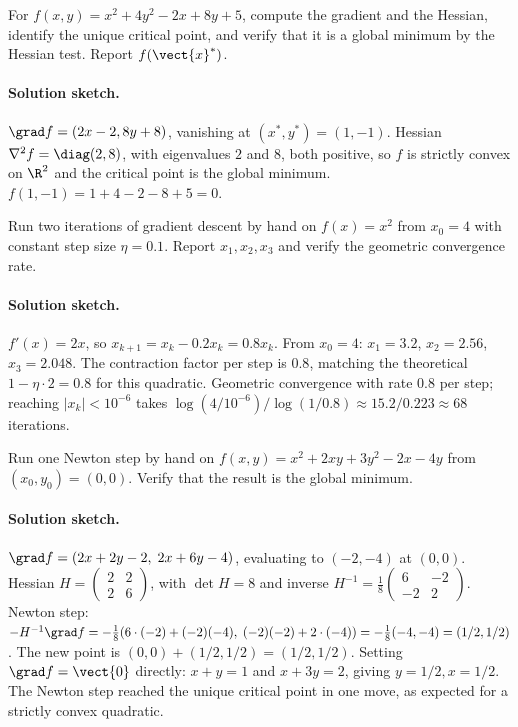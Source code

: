 \begin{exercise}
For $f(x, y) = x^{2} + 4 y^{2} - 2 x + 8 y + 5$, compute the
gradient and the Hessian, identify the unique critical point, and
verify that it is a global minimum by the Hessian test. Report
$f(\vect{x}^{*})$.
\end{exercise}

\paragraph{Solution sketch.}
$\grad f = (2 x - 2, 8 y + 8)$, vanishing at $(x^{*}, y^{*}) =
(1, -1)$. Hessian $\nabla^{2} f = \diag(2, 8)$, with eigenvalues
$2$ and $8$, both positive, so $f$ is strictly convex on $\R^{2}$
and the critical point is the global minimum. $f(1, -1) = 1 + 4 -
2 - 8 + 5 = 0$.

\begin{exercise}
Run two iterations of gradient descent by hand on $f(x) = x^{2}$
from $x_{0} = 4$ with constant step size $\eta = 0.1$. Report
$x_{1}, x_{2}, x_{3}$ and verify the geometric convergence rate.
\end{exercise}

\paragraph{Solution sketch.}
$f'(x) = 2x$, so $x_{k+1} = x_{k} - 0.2 x_{k} = 0.8 x_{k}$. From
$x_{0} = 4$: $x_{1} = 3.2$, $x_{2} = 2.56$, $x_{3} = 2.048$. The
contraction factor per step is $0.8$, matching the theoretical
$1 - \eta \cdot 2 = 0.8$ for this quadratic. Geometric convergence
with rate $0.8$ per step; reaching $|x_{k}| < 10^{-6}$ takes
$\log(4/10^{-6}) / \log(1/0.8) \approx 15.2 / 0.223 \approx 68$
iterations.

\begin{exercise}
Run one Newton step by hand on $f(x, y) = x^{2} + 2 x y + 3 y^{2}
- 2 x - 4 y$ from $(x_{0}, y_{0}) = (0, 0)$. Verify that the
result is the global minimum.
\end{exercise}

\paragraph{Solution sketch.}
$\grad f = (2 x + 2 y - 2, \; 2 x + 6 y - 4)$, evaluating to
$(-2, -4)$ at $(0, 0)$. Hessian $H = \begin{pmatrix} 2 & 2 \\ 2 & 6
\end{pmatrix}$, with $\det H = 8$ and inverse $H^{-1} = \tfrac{1}{8}
\begin{pmatrix} 6 & -2 \\ -2 & 2 \end{pmatrix}$. Newton step:
$-H^{-1} \grad f = -\tfrac{1}{8} (6 \cdot (-2) + (-2)(-4), \;
(-2)(-2) + 2 \cdot (-4)) = -\tfrac{1}{8} (-4, -4) = (1/2, 1/2)$.
The new point is $(0, 0) + (1/2, 1/2) = (1/2, 1/2)$. Setting $\grad
f = \vect{0}$ directly: $x + y = 1$ and $x + 3 y = 2$, giving $y =
1/2, x = 1/2$. The Newton step reached the unique critical point
in one move, as expected for a strictly convex quadratic.

